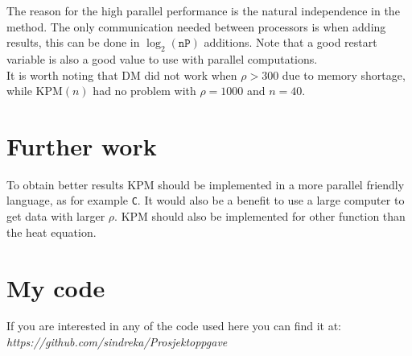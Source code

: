 The reason for the high parallel performance is the natural independence in the method. The only communication needed between processors is when adding results, this can be done in $\log_2(\texttt{nP})$ additions. Note that a good restart variable is also a good value to use with parallel computations. \\

It is worth noting that DM did not work when $\rho>300$ due to memory shortage, while KPM$(n)$ had no problem with $\rho = 1000$ and $n = 40$. \\




\chapter*{Further work}%
To obtain better results KPM should be implemented in a more parallel friendly language, as for example \texttt{C}. It would also be a benefit to use a large computer to get data with larger $\rho$.
KPM should also be implemented for other function than the heat equation. 
\chapter*{My code}%

If you are interested in any of the code used here you can find it at: \\
\emph{https://github.com/sindreka/Prosjektoppgave}




